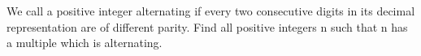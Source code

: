 \item We call a positive integer alternating if every two consecutive digits in its decimal representation are of different parity. Find all positive integers n such that n has a multiple which is alternating.


